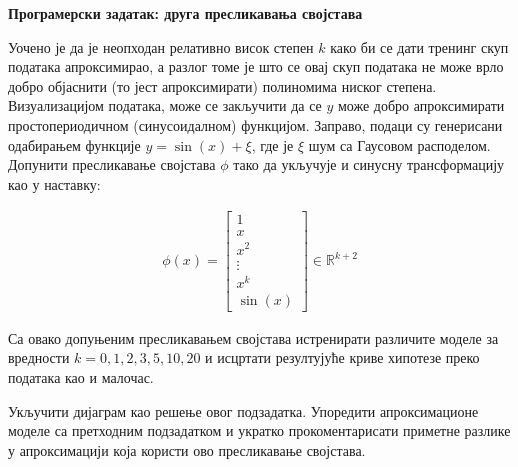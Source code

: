 \item{} {\bf Програмерски задатак: друга пресликавања својстава}

Уочено је да је неопходан релативно висок степен $k$ како би се дати тренинг скуп података апроксимирао, а разлог томе је што се овај скуп података не може врло добро објаснити (то јест апроксимирати) полиномима ниског степена. Визуализацијом података, може се закључити да се $y$ може добро апроксимирати простопериодичном (синусоидалном) функцијом. Заправо, подаци су генерисани одабирањем функције $y = \sin(x) + \xi$, где је $\xi$ шум са Гаусовом расподелом. Допунити пресликавање својстава $\phi$ тако да укључује и синусну трансформацију као у наставку:

\begin{align}
\phi(x) = \left[\begin{array}{c} 1\\ x \\ x^2\\ \vdots \\x^k \\ \sin(x) \end{array}\right]\in \mathbb{R}^{k+2} \label{eqn:feature-sine}
\end{align}

Са овако допуњеним пресликавањем својстава истренирати различите моделе за вредности $k=0,1,2,3,5,10,20$ и исцртати резултујуће криве хипотезе преко података као и малочас.

Укључити дијаграм као решење овог подзадатка. Упоредити апроксимационе моделе са претходним подзадатком и укратко прокоментарисати приметне разлике у апроксимацији која користи ово пресликавање својстава.

